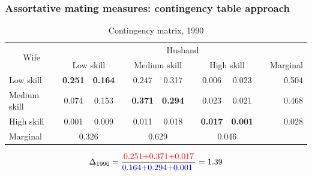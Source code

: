 \documentclass{beamer}
\begin{document}
\begin{frame}[noframenumbering]
	\frametitle{Assortative mating measures: contingency table approach}\label{appendix:ct_approach}
	\tiny
	\begin{table}[htbp]
		\centering
		\caption{Contingency matrix, 1990}
		\begin{tabular}{lccrccrccrr}
			\toprule
			\multicolumn{1}{c}{\multirow{2}[4]{*}{Wife}} & \multicolumn{10}{c}{Husband} \\
			\cmidrule{2-11}          & \multicolumn{2}{c}{Low skill} &       & \multicolumn{2}{c}{Medium skill} &       & \multicolumn{2}{c}{High skill} &       & \multicolumn{1}{l}{Marginal} \\
			\midrule
			Low skill & \textcolor[rgb]{ .753,  0,  0}{\textbf{0.251}} & \textcolor[rgb]{ 0,  .439,  .753}{\textbf{0.164}} &       & 0.247 & 0.317 &       & 0.006 & 0.023 &       & 0.504 \\
			Medium skill & 0.074 & 0.153 &       & \textcolor[rgb]{ .753,  0,  0}{\textbf{0.371}} & \textcolor[rgb]{ 0,  .439,  .753}{\textbf{0.294}} &       & 0.023 & 0.021 &       & 0.468 \\
			High skill & 0.001 & 0.009 &       & 0.011 & 0.018 &       & \textcolor[rgb]{ .753,  0,  0}{\textbf{0.017}} & \textcolor[rgb]{ 0,  .439,  .753}{\textbf{0.001}} &       & 0.028 \\
			Marginal & \multicolumn{2}{c}{0.326} &       & \multicolumn{2}{c}{0.629} &       & \multicolumn{2}{c}{0.046} &       &  \\
			\bottomrule
			\bottomrule
		\end{tabular}
	\end{table}
	
	\begin{align*}
		\Delta_{1990}=\frac{\text{\textcolor{red}{0.251+0.371+0.017}}}{\text{\textcolor{blue}{0.164+0.294+0.001
		}}}=1.39
	\end{align*}
		
	\hyperlink{appendix:assortative_mating}{}
	\hyperlink{frame:calib_results_ms}{}
	\hyperlink{frame:fit_ms}{}
\end{frame}
\end{document}
